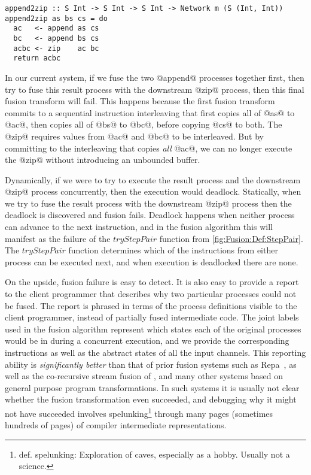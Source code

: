 \begin{lstlisting}[float,label=l:bench:append2zip,caption=append2zip; S stands for Stream]
append2zip :: S Int -> S Int -> S Int -> Network m (S (Int, Int))
append2zip as bs cs = do
  ac   <- append as cs
  bc   <- append bs cs
  acbc <- zip    ac bc
  return acbc
\end{lstlisting}

In our current system, if we fuse the two @append@ processes together first, then try to fuse this result process with the downstream @zip@ process, then this final fusion transform will fail.
This happens because the first fusion transform commits to a sequential instruction interleaving that first copies all of @as@ to @ac@, then copies all of @bs@ to @bc@, before copying @cs@ to both.
The @zip@ requires values from @ac@ and @bc@ to be interleaved.
But by committing to the interleaving that copies \emph{all} @ac@, we can no longer execute the @zip@ without introducing an unbounded buffer.

Dynamically, if we were to try to execute the result process and the downstream @zip@ process concurrently, then the execution would deadlock.
Statically, when we try to fuse the result process with the downstream @zip@ process then the deadlock is discovered and fusion fails.
Deadlock happens when neither process can advance to the next instruction, and in the fusion algorithm this will manifest as the failure of the $tryStepPair$ function from \autoref{fig:Fusion:Def:StepPair}.
The $tryStepPair$ function determines which of the instructions from either process can be executed next, and when execution is deadlocked there are none.

On the upside, fusion failure is easy to detect.
It is also easy to provide a report to the client programmer that describes why two particular processes could not be fused.
The report is phrased in terms of the process definitions visible to the client programmer, instead of partially fused intermediate code.
The joint labels used in the fusion algorithm represent which states each of the original processes would be in during a concurrent execution, and we provide the corresponding instructions as well as the abstract states of all the input channels.
This reporting ability is \emph{significantly better} than that of prior fusion systems such as Repa~\cite{lippmeier2012guiding}, as well as the co-recursive stream fusion of \cite{coutts2007stream}, and many other systems based on general purpose program transformations.
In such systems it is usually not clear whether the fusion transformation even succeeded, and debugging why it might not have succeeded involves spelunking\footnote{def. spelunking: Exploration of caves, especially as a hobby. Usually not a science.} through many pages (sometimes hundreds of pages) of compiler intermediate representations.


